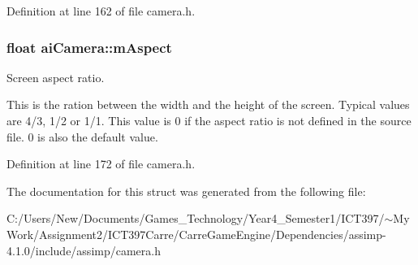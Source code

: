 Definition at line 162 of file camera.h.\hypertarget{structai_camera_e414556eaa6f910b5927f465d97bf70c}{
\subsubsection[mAspect]{\setlength{\rightskip}{0pt plus 5cm}float {\bf aiCamera::mAspect}}}
\label{structai_camera_e414556eaa6f910b5927f465d97bf70c}


Screen aspect ratio.

This is the ration between the width and the height of the screen. Typical values are 4/3, 1/2 or 1/1. This value is 0 if the aspect ratio is not defined in the source file. 0 is also the default value. 

Definition at line 172 of file camera.h.

The documentation for this struct was generated from the following file:\begin{CompactItemize}
\item 
C:/Users/New/Documents/Games\_\-Technology/Year4\_\-Semester1/ICT397/$\sim$My Work/Assignment2/ICT397Carre/CarreGameEngine/Dependencies/assimp-4.1.0/include/assimp/camera.h\end{CompactItemize}
